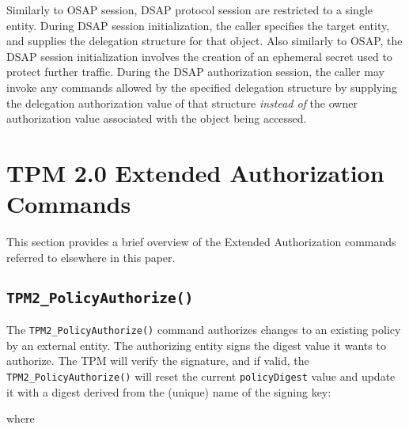 \documentclass{sig-alternate-2013}
\begin{document}
Similarly to OSAP session, DSAP protocol session are restricted to a single
entity. During DSAP session initialization, the caller specifies the target
entity, and supplies the delegation structure for that object. Also similarly to
OSAP, the DSAP session initialization involves the creation of an ephemeral
secret used to protect further traffic. During the DSAP authorization session,
the caller may invoke any commands allowed by the specified delegation structure
by supplying the delegation authorization value of that structure \emph{instead
of} the owner authorization value associated with the object being accessed.

\section{TPM 2.0 Extended Authorization Commands}
\label{appendix:extended-authorization-commands}

This section provides a brief overview of the Extended Authorization commands
referred to elsewhere in this paper.

\subsection{\texttt{TPM2\_PolicyAuthorize()}}

The \texttt{TPM2\_PolicyAuthorize()} command authorizes changes to an existing
policy by an external entity. The authorizing entity signs the digest value it
wants to authorize. The TPM will verify the signature, and if valid, the
\texttt{TPM2\_PolicyAuthorize()} will reset the current \texttt{policyDigest}
value and update it with a digest derived from the (unique) name of the signing
key:

\vspace{.5\baselineskip}
\noindent
{}

\vspace{.5\baselineskip}
\noindent where
\end{document}
